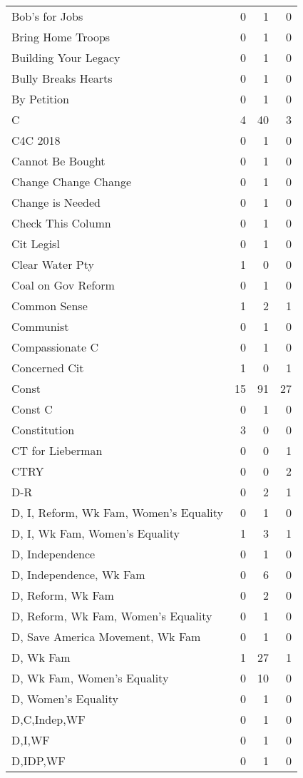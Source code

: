 \begin{supertabular}{lrrr}
Bob's for Jobs & 0 & 1 & 0\\
Bring Home Troops & 0 & 1 & 0\\
Building Your Legacy & 0 & 1 & 0\\
Bully Breaks Hearts & 0 & 1 & 0\\
By Petition & 0 & 1 & 0\\
C & 4 & 40 & 3\\
C4C 2018 & 0 & 1 & 0\\
Cannot Be Bought & 0 & 1 & 0\\
Change Change Change & 0 & 1 & 0\\
Change is Needed & 0 & 1 & 0\\
Check This Column & 0 & 1 & 0\\
Cit Legisl & 0 & 1 & 0\\
Clear Water Pty & 1 & 0 & 0\\
Coal on Gov Reform & 0 & 1 & 0\\
Common Sense & 1 & 2 & 1\\
Communist & 0 & 1 & 0\\
Compassionate C & 0 & 1 & 0\\
Concerned Cit & 1 & 0 & 1\\
Const & 15 & 91 & 27\\
Const C & 0 & 1 & 0\\
Constitution & 3 & 0 & 0\\
CT for Lieberman & 0 & 0 & 1\\
CTRY & 0 & 0 & 2\\
D-R & 0 & 2 & 1\\
D, I, Reform, Wk Fam, Women's Equality & 0 & 1 & 0\\
D, I, Wk Fam, Women's Equality & 1 & 3 & 1\\
D, Independence & 0 & 1 & 0\\
D, Independence, Wk Fam & 0 & 6 & 0\\
D, Reform, Wk Fam & 0 & 2 & 0\\
D, Reform, Wk Fam, Women's Equality & 0 & 1 & 0\\
D, Save America Movement, Wk Fam & 0 & 1 & 0\\
D, Wk Fam & 1 & 27 & 1\\
D, Wk Fam, Women's Equality & 0 & 10 & 0\\
D, Women's Equality & 0 & 1 & 0\\
D,C,Indep,WF & 0 & 1 & 0\\
D,I,WF & 0 & 1 & 0\\
D,IDP,WF & 0 & 1 & 0\\

\end{supertabular}
